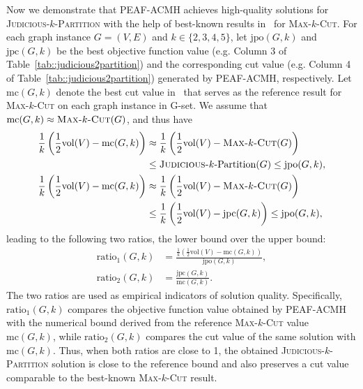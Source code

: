 \documentclass[12pt, a4paper]{article}%
\newcommand{\vol}{\mathrm{vol}}
\numberwithin{equation}{section}
\theoremstyle{plain}
\begin{document}
			Now we demonstrate that PEAF-ACMH achieves high-quality solutions for \textsc{Judicious}-$k$-\textsc{Partition} with the help of best-known results in~\cite{Ma2015} for \textsc{Max}-$k$-\textsc{Cut}. For each graph instance $G=(V,E)$ and $k\in\{2,3,4,5\}$, let $\text{jpo}(G,k)$ and $\text{jpc}(G,k)$ be the best objective function value (e.g. Column 3 of Table~\ref{tab::judicious2partition}) and the corresponding cut value (e.g. Column 4 of Table~\ref{tab::judicious2partition}) generated by PEAF-ACMH, respectively. Let $\text{mc}(G,k)$ denote the best cut value in~\cite{Ma2015} that serves as the reference result for \textsc{Max-}$k$\textsc{-Cut} on each graph instance in G-set. We assume that $\text{mc}(G,k)\approx\textsc{Max-}k\textsc{-Cut}(G)$, and thus have
			\begin{equation}
				\label{neq:jp}
				\begin{aligned}
					\frac{1}{k}\left(\frac{1}{2}\vol(V)-\text{mc}(G,k)\right)&\approx	\frac{1}{k}\left(\frac{1}{2}\vol(V)-\textsc{Max-}k\textsc{-Cut}(G)\right)\\
					& \leq \textsc{Judicious-}k\text{-Partition}(G)\leq \text{jpo}(G,k),\\
					\frac{1}{k}\left(\frac{1}{2}\vol(V)-\text{mc}(G,k)\right)&\approx	\frac{1}{k}\left(\frac{1}{2}\vol(V)-\textsc{Max-}k\textsc{-Cut}(G)\right)\\&\leq \frac{1}{k}\left(\frac{1}{2}\vol(V)-\text{jpc}(G,k)\right)\leq \text{jpo}(G,k),
				\end{aligned}
			\end{equation}
			leading to the following two ratios, the lower bound over the upper bound:
			\begin{align}
				\label{jp:ratio1}
				\text{ratio}_1(G,k) &= \frac{\frac{1}{k}\left(\frac{1}{2}\vol(V)-\text{mc}(G,k)\right)}{\text{jpo}(G,k)}, \\
				\text{ratio}_2(G,k) &= \frac{\text{jpc}(G,k)}{\text{mc}(G,k)}. \label{jp:ratio2}
			\end{align}
            {The two ratios are used as empirical indicators of solution quality. 
Specifically, $\text{ratio}_1(G,k)$ compares the objective function value obtained by
PEAF-ACMH with the numerical bound derived from the reference
\textsc{Max}-$k$-\textsc{Cut} value $\text{mc}(G,k)$, while
$\text{ratio}_2(G,k)$ compares the cut value of the same solution with
$\text{mc}(G,k)$. Thus, when both ratios are close to 1, the obtained
\textsc{Judicious}-$k$-\textsc{Partition} solution is close to the reference
bound and also preserves a cut value comparable to the best-known
\textsc{Max}-$k$-\textsc{Cut} result.}
\end{document}
